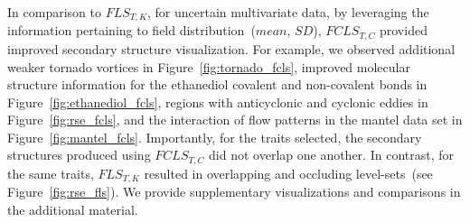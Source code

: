 In comparison to $FLS_{T,K}$, for uncertain multivariate data, by leveraging the information pertaining to field distribution~($mean$, $SD$), $FCLS_{T,C}$ provided improved secondary structure visualization.
%
For example, we observed additional weaker tornado vortices in Figure~\ref{fig:tornado_fcls}, improved molecular structure information for the ethanediol covalent and non-covalent bonds in Figure~\ref{fig:ethanediol_fcls}, regions with anticyclonic and cyclonic eddies in Figure~\ref{fig:rse_fcls}, and the interaction of flow patterns in the mantel data set in Figure~\ref{fig:mantel_fcls}.
%
Importantly, for the traits selected, the secondary structures produced using $FCLS_{T,C}$ did not overlap one another.
%
In contrast, for the same traits, $FLS_{T,K}$ resulted in overlapping and occluding level-sets~(see Figure~\ref{fig:rse_fls}).
%
We provide supplementary visualizations and comparisons in the additional material. 
 
